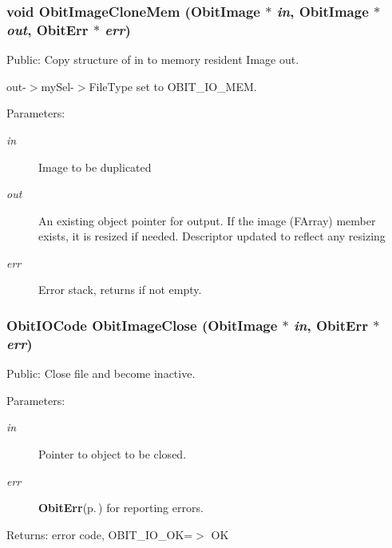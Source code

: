 \subsubsection{\setlength{\rightskip}{0pt plus 5cm}void Obit\-Image\-Clone\-Mem ({\bf Obit\-Image} $\ast$ {\em in}, {\bf Obit\-Image} $\ast$ {\em out}, {\bf Obit\-Err} $\ast$ {\em err})}\label{ObitImage_8c_a19}


Public: Copy structure of in to memory resident Image out. 

out-$>$my\-Sel-$>$File\-Type set to OBIT\_\-IO\_\-MEM. \begin{Desc}
\item[Parameters:]
\begin{description}
\item[{\em in}]Image to be duplicated \item[{\em out}]An existing object pointer for output. If the image (FArray) member exists, it is resized if needed. Descriptor updated to reflect any resizing \item[{\em err}]Error stack, returns if not empty. \end{description}
\end{Desc}
\subsubsection{\setlength{\rightskip}{0pt plus 5cm}Obit\-IOCode Obit\-Image\-Close ({\bf Obit\-Image} $\ast$ {\em in}, {\bf Obit\-Err} $\ast$ {\em err})}\label{ObitImage_8c_a21}


Public: Close file and become inactive. 

\begin{Desc}
\item[Parameters:]
\begin{description}
\item[{\em in}]Pointer to object to be closed. \item[{\em err}]{\bf Obit\-Err}{\rm (p.\,\pageref{structObitErr})} for reporting errors. \end{description}
\end{Desc}
\begin{Desc}
\item[Returns:]error code, OBIT\_\-IO\_\-OK=$>$ OK \end{Desc}
